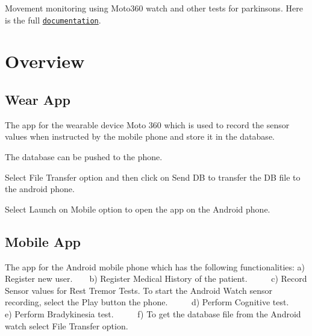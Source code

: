 Movement monitoring using Moto360 watch and other tests for parkinsons. Here is the full \href{http://htmlpreview.github.com/?https://github.com/deshmukhrajvardhan/WearableParkinsonsMonitoringSystem/blob/master/html/index.html}{\tt documentation}.

\section*{Overview}

\subsection*{Wear App}

The app for the wearable device \textquotesingle{}Moto 360\textquotesingle{} which is used to record the sensor values when instructed by the mobile phone and store it in the database. ~\newline
  ~\newline
  ~\newline
  ~\newline


The database can be pushed to the phone. ~\newline
  ~\newline


Select {\ttfamily File Transfer} option and then click on {\ttfamily Send DB} to transfer the DB file to the android phone. ~\newline
  ~\newline


Select {\ttfamily Launch on Mobile} option to open the app on the Android phone. ~\newline


\subsection*{Mobile App}

The app for the Android mobile phone which has the following functionalities\+: a) Register new user. ~\newline
  ~\newline
 b) Register Medical History of the patient. ~\newline
  ~\newline
  ~\newline
 c) Record Sensor values for Rest Tremor Tests. To start the Android Watch sensor recording, select the {\ttfamily Play} button the phone. ~\newline
  ~\newline
  ~\newline
 d) Perform Cognitive test. ~\newline
  ~\newline
 e) Perform Bradykinesia test. ~\newline
  ~\newline
  ~\newline
 f) To get the database file from the Android watch select File Transfer option. ~\newline
  ~\newline


